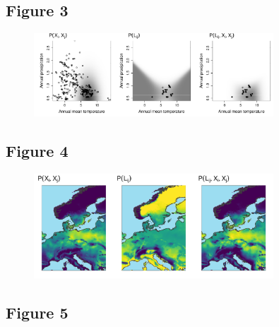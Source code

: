 \documentclass[12pt]{article}
\begin{document}
\newpage

\subsection*{Figure 3}

\begin{figure}[ht!]
\centering\includegraphics[width=0.8\textwidth]{figures/example_pair}
\end{figure}

\newpage

\subsection*{Figure 4}

\begin{figure}[ht!]
\centering\includegraphics[width=0.8\textwidth]{figures/map_pair}
\end{figure}

\newpage




\subsection*{Figure 5}
\end{document}
